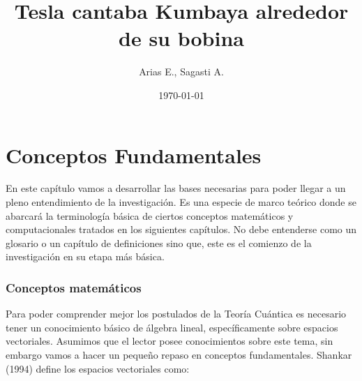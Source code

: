 \documentclass[11pt,a4paper]{article}
\author{Arias E., Sagasti A.}
\date{\today}
\title{Tesla cantaba Kumbaya alrededor de su bobina}
\begin{document}
\begin{titlepage}
\maketitle
\end{titlepage}
\part{Conceptos Fundamentales}
En este capítulo vamos a desarrollar las bases necesarias para poder llegar a un pleno entendimiento de la investigación. Es una especie de marco teórico donde se abarcará la terminología básica de ciertos conceptos matemáticos y computacionales tratados en los siguientes capítulos. No debe entenderse como un glosario o un capítulo de definiciones sino que, este es el comienzo de la investigación en su etapa más básica.

\section*{Conceptos matemáticos}
Para poder comprender mejor los postulados de la Teoría Cuántica es necesario tener un conocimiento básico de álgebra lineal, específicamente sobre espacios vectoriales. Asumimos que el lector posee conocimientos sobre este tema, sin embargo vamos a hacer un pequeño repaso en conceptos fundamentales. 
Shankar (1994) define los espacios vectoriales como:
\end{document}

